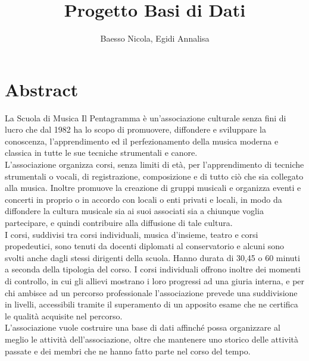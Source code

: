 \documentclass[11pt]{article}
\title{Progetto Basi di Dati}
\author{Baesso Nicola, Egidi Annalisa}
\begin{document}

\maketitle %
\begin{center} %
\end{center}

\section{Abstract}
La Scuola di Musica Il Pentagramma è un’associazione culturale senza fini di lucro che dal 1982 ha lo scopo di promuovere, diffondere e sviluppare la conoscenza, l’apprendimento ed il perfezionamento della musica moderna e classica in tutte le sue tecniche strumentali e canore.\\
L'associazione organizza corsi, senza limiti di età, per l'apprendimento di tecniche strumentali o vocali, di registrazione, composizione e di tutto ciò che sia collegato alla musica. Inoltre promuove la creazione di gruppi musicali e organizza eventi e concerti in proprio o in accordo con locali o enti privati e locali, in modo da diffondere la cultura musicale sia ai suoi associati sia a chiunque voglia partecipare, e quindi contribuire alla diffusione di tale cultura.\\
I corsi, suddivisi tra corsi individuali, musica d'insieme, teatro e corsi propedeutici, sono tenuti da docenti diplomati al conservatorio e alcuni sono svolti anche dagli stessi dirigenti della scuola. Hanno durata di 30,45 o 60 minuti a seconda della tipologia del corso. I corsi individuali offrono inoltre dei momenti di controllo, in cui gli allievi mostrano i loro progressi ad una giuria interna, e per chi ambisce ad un percorso professionale l'associazione prevede una suddivisione in livelli, accessibili tramite il superamento di un apposito esame che ne certifica le qualità acquisite nel percorso.\\
L'associazione vuole costruire una base di dati affinché possa organizzare al meglio le attività dell'associazione, oltre che mantenere uno storico delle attività passate e dei membri che ne hanno fatto parte nel corso del tempo.
\end{document}
